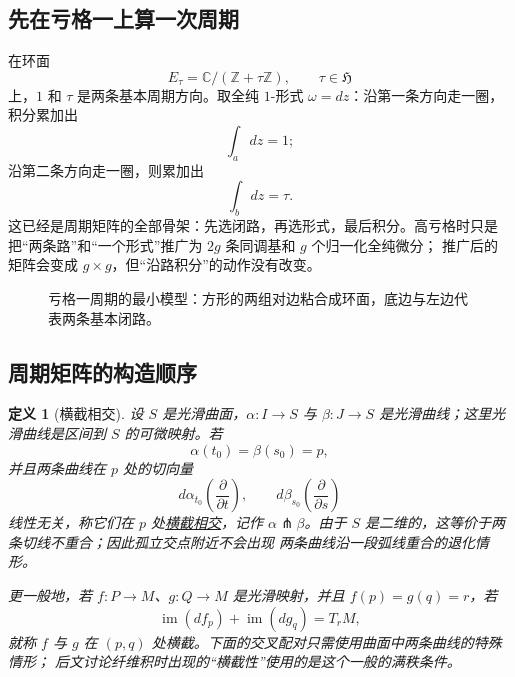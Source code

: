 \documentclass[UTF8,fontset=none,a4paper,11pt]{ctexart}
\theoremstyle{foundation-definition}
\newtheorem{definition}{定义}[section]
\theoremstyle{foundation-theorem}
\theoremstyle{foundation-proposition}
\theoremstyle{foundation-example}
\theoremstyle{foundation-remark}
\theoremstyle{foundation-theorem}
\newcommand{\term}[2]{\hyperref[#1]{#2}}
\begin{document}
\subsection{先在亏格一上算一次周期}

在环面
\[
E_\tau=\mathbb C/(\mathbb Z+\tau\mathbb Z),\qquad \tau\in\mathfrak H
\]
上，\(1\) 和 \(\tau\) 是两条基本周期方向。取全纯 \(1\)-形式
\(\omega=dz\)：沿第一条方向走一圈，积分累加出
\[
\int_a dz=1;
\]
沿第二条方向走一圈，则累加出
\[
\int_b dz=\tau.
\]
这已经是周期矩阵的全部骨架：先选闭路，再选形式，最后积分。高亏格时只是
把“两条路”和“一个形式”推广为 \(2g\) 条同调基和 \(g\) 个归一化全纯微分；
推广后的矩阵会变成 \(g\times g\)，但“沿路积分”的动作没有改变。

\begin{figure}[htbp]
\centering
{}
\caption{亏格一周期的最小模型：方形的两组对边粘合成环面，底边与左边代表两条基本闭路。}
\label{fig:genus-one-period}
\end{figure}

\subsection{周期矩阵的构造顺序}

\begin{definition}[横截相交]\label{def:transverse-intersection}
设 \(S\) 是光滑曲面，\(\alpha:I\to S\) 与 \(\beta:J\to S\) 是光滑曲线；这里光滑曲线是区间到
\(S\) 的可微映射。若
\[
\alpha(t_0)=\beta(s_0)=p,
\]
并且两条曲线在 \(p\) 处的切向量
\[
d\alpha_{t_0}\!\left(\frac{\partial}{\partial t}\right),
\qquad
d\beta_{s_0}\!\left(\frac{\partial}{\partial s}\right)
\]
线性无关，称它们在 \(p\) 处\term{def:transverse-intersection}{横截相交}，记作
\(\alpha\pitchfork\beta\)。由于 \(S\) 是二维的，这等价于两条切线不重合；因此孤立交点附近不会出现
两条曲线沿一段弧线重合的退化情形。

更一般地，若 \(f:P\to M\)、\(g:Q\to M\) 是光滑映射，并且
\(f(p)=g(q)=r\)，若
\[
\operatorname{im}(df_p)+\operatorname{im}(dg_q)=T_rM,
\]
就称 \(f\) 与 \(g\) 在 \((p,q)\) 处横截。下面的交叉配对只需使用曲面中两条曲线的特殊情形；
后文讨论纤维积时出现的“横截性”使用的是这个一般的满秩条件。
\end{definition}
\end{document}
